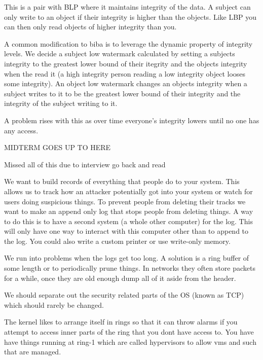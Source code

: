 \documentclass{article}
\begin{document}
\begin{itemizeP}

This is a pair with BLP where it maintains integrity of the data. A subject can only write to an object if their integrity is higher than the objects. Like LBP you can then only read objects of higher integrity than you.


A common modification to biba is to leverage the dynamic property of integrity levels. We decide a subject low watermark calculated by setting a subjects integrity to the greatest lower bound of their itegrity and the objects integrity when the read it (a high integrity person reading a low integrity object looses some integrity). An object low watermark changes an objects integrity when a subject writes to it to be the greatest lower bound of their integrity and the integrity of the subject writing to it.

A problem rises with this as over time everyone's integrity lowers until no one has any access.






MIDTERM GOES UP TO HERE



Missed all of this due to interview go back and read



We want to build records of everything that people do to your system. This allows us to track how an attacker potentially got into your system or watch for users doing suspicious things. To prevent people from deleting their tracks we want to make an append only log that stops people from deleting things. A way to do this is to have a second system (a whole other computer) for the log. This will only have one way to interact with this computer other than to append to the log. You could also write a custom printer or use write-only memory. 

We run into problems when the logs get too long. A solution is a ring buffer of some length or to periodically prune things. In networks they often store packets for a while, once they are old enough dump all of it aside from the header. 



We should separate out the security related parts of the OS (known as TCP) which should rarely be changed. 



The kernel likes to arrange itself in rings so that it can throw alarms if you attempt to access inner parts of the ring that you dont have access to. You have have things running at ring-1 which are called hypervisors to allow vms and such that are managed.


\end{itemizeP}
\end{document}
